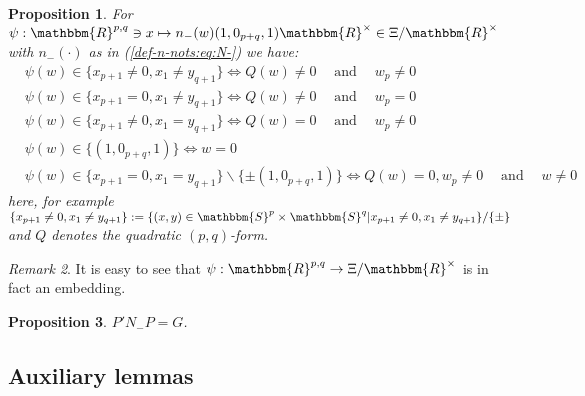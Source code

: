 \documentclass{article}
\newcommand{\assign}{:=}
\newcommand{\nocomma}{}
\newcommand{\tmop}[1]{\ensuremath{\operatorname{#1}}}
\newtheorem{proposition}{Proposition}[section]
\theoremstyle{remark}
\newtheorem{remark}[proposition]{Remark}
\begin{document}
\begin{proposition}
  \label{doublePGP:prop-pullback-of-orbits}For $\psi : \mathbbm{R}^{p, q} \ni
  x \mapsto n_- (w) (1, 0_{p + q}, 1) \mathbbm{R}^{\times} \in \Xi
  /\mathbbm{R}^{\times}$ with $n_- (\cdot)$ as in (\ref{def-n-nots:eq:N-}) we
  have:
  \begin{eqnarray}
    & \psi (w) \in \{ x_{p + 1} \neq 0, x_1 \neq y_{q + 1} \} \Leftrightarrow
    Q (w) \neq 0 \quad \tmop{and} \quad w_p \neq 0 &  \nonumber\\
    & \psi (w) \in \{ x_{p + 1} = 0, x_1 \neq y_{q + 1} \} \Leftrightarrow Q
    (w) \neq 0 \quad \tmop{and} \quad w_p = 0 &  \nonumber\\
    & \psi (w) \in \{ x_{p + 1} \neq 0, x_1 = y_{q + 1} \} \Leftrightarrow Q
    (w) = 0 \quad \tmop{and} \quad w_p \neq 0 &  \nonumber\\
    & \psi (w) \in \{ (1, 0_{p + q}, 1) \} \Leftrightarrow w = 0 & 
    \nonumber\\
    & \psi (w) \in \{ x_{p + 1} = 0, x_1 = y_{q + 1} \} \backslash \{ \pm (1,
    0_{p + q}, 1) \} \Leftrightarrow Q (w) = 0 \nocomma, w_p \neq 0 \quad
    \tmop{and} \quad w \neq 0 &  \nonumber
  \end{eqnarray}
  here, for example $\{ x_{p + 1} \neq 0, x_1 \neq y_{q + 1} \} \assign \{ (x,
  y) \in \mathbbm{S}^p \times \mathbbm{S}^q | x_{p + 1} \neq 0, x_1 \neq y_{q
  + 1} \} / \{ \pm \}$ and $Q$ denotes the quadratic $(p, q)$-form.
\end{proposition}

\begin{remark}
  It is easy to see that $\psi : \mathbbm{R}^{p, q} \rightarrow \Xi
  /\mathbbm{R}^{\times}$ is in fact an embedding.
\end{remark}

\begin{proposition}
  \label{doublePGP:prop-pnp}$P' N_- P = G$.
\end{proposition}

\subsection{Auxiliary lemmas}
\end{document}
